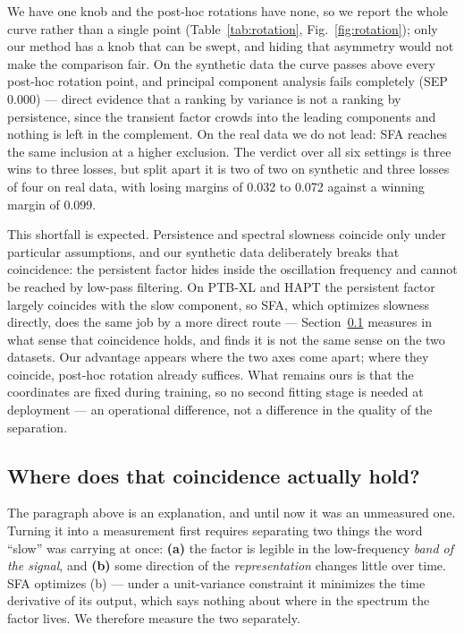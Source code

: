 We have one knob and the post-hoc rotations have none, so we report the whole curve rather than a single point (Table~\ref{tab:rotation}, Fig.~\ref{fig:rotation}); only our method has a knob that can be swept, and hiding that asymmetry would not make the comparison fair. On the synthetic data the curve passes above every post-hoc rotation point, and principal component analysis fails completely (SEP 0.000) --- direct evidence that a ranking by variance is not a ranking by persistence, since the transient factor crowds into the leading components and nothing is left in the complement. On the real data we do not lead: SFA reaches the same inclusion at a higher exclusion. The verdict over all six settings is three wins to three losses, but split apart it is two of two on synthetic and three losses of four on real data, with losing margins of 0.032 to 0.072 against a winning margin of 0.099.

This shortfall is expected. Persistence and spectral slowness coincide only under particular assumptions, and our synthetic data deliberately breaks that coincidence: the persistent factor hides inside the oscillation frequency and cannot be reached by low-pass filtering. On PTB-XL and HAPT the persistent factor largely coincides with the slow component, so SFA, which optimizes slowness directly, does the same job by a more direct route --- Section~\ref{sec:coincidence} measures in what sense that coincidence holds, and finds it is not the same sense on the two datasets. Our advantage appears where the two axes come apart; where they coincide, post-hoc rotation already suffices. What remains ours is that the coordinates are fixed during training, so no second fitting stage is needed at deployment --- an operational difference, not a difference in the quality of the separation.

\subsection{Where does that coincidence actually hold?}
\label{sec:coincidence}

The paragraph above is an explanation, and until now it was an unmeasured one. Turning it into a measurement first requires separating two things the word ``slow'' was carrying at once: \textbf{(a)} the factor is legible in the low-frequency \emph{band of the signal}, and \textbf{(b)} some direction of the \emph{representation} changes little over time. SFA optimizes (b) --- under a unit-variance constraint it minimizes the time derivative of its output, which says nothing about where in the spectrum the factor lives. We therefore measure the two separately.

